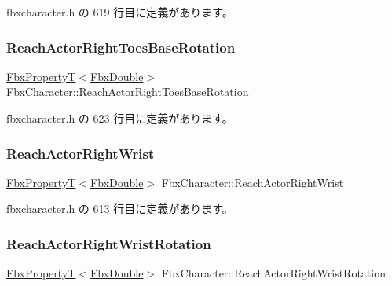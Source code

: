  fbxcharacter.\+h の 619 行目に定義があります。

\mbox{\label{class_fbx_character_a04b250a928d03e2047b49640e07e051a}} 
\subsubsection{\texorpdfstring{Reach\+Actor\+Right\+Toes\+Base\+Rotation}{ReachActorRightToesBaseRotation}}
{\footnotesize\ttfamily \hyperlink{class_fbx_property_t}{Fbx\+PropertyT}$<$\hyperlink{fbxtypes_8h_a171e72a1c46fc15c1a6c9c31948c1c5b}{Fbx\+Double}$>$ Fbx\+Character\+::\+Reach\+Actor\+Right\+Toes\+Base\+Rotation}



 fbxcharacter.\+h の 623 行目に定義があります。

\mbox{\label{class_fbx_character_a8bf40a85f0b1f63db3b4b35f8f753d81}} 
\subsubsection{\texorpdfstring{Reach\+Actor\+Right\+Wrist}{ReachActorRightWrist}}
{\footnotesize\ttfamily \hyperlink{class_fbx_property_t}{Fbx\+PropertyT}$<$\hyperlink{fbxtypes_8h_a171e72a1c46fc15c1a6c9c31948c1c5b}{Fbx\+Double}$>$ Fbx\+Character\+::\+Reach\+Actor\+Right\+Wrist}



 fbxcharacter.\+h の 613 行目に定義があります。

\mbox{\label{class_fbx_character_aa53997798ecc3efe6447dc4bef4de1a4}} 
\subsubsection{\texorpdfstring{Reach\+Actor\+Right\+Wrist\+Rotation}{ReachActorRightWristRotation}}
{\footnotesize\ttfamily \hyperlink{class_fbx_property_t}{Fbx\+PropertyT}$<$\hyperlink{fbxtypes_8h_a171e72a1c46fc15c1a6c9c31948c1c5b}{Fbx\+Double}$>$ Fbx\+Character\+::\+Reach\+Actor\+Right\+Wrist\+Rotation}



